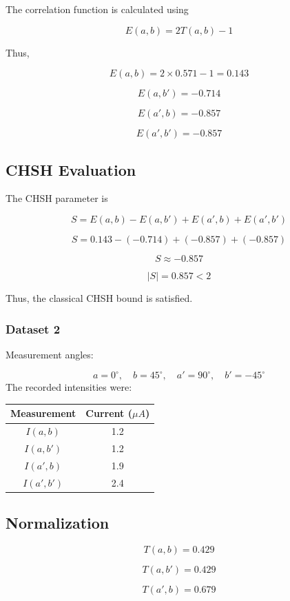 \documentclass[14pt,a4paper]{extarticle}
\begin{document}
The correlation function is calculated using

\[
E(a,b) = 2T(a,b) - 1
\]

Thus,

\[
E(a,b) = 2\times0.571 - 1 = 0.143
\]

\[
E(a,b') = -0.714
\]

\[
E(a',b) = -0.857
\]

\[
E(a',b') = -0.857
\]

\subsection {CHSH Evaluation}

The CHSH parameter is

\[
S = E(a,b) - E(a,b') + E(a',b) + E(a',b')
\]

\[
S = 0.143 - (-0.714) + (-0.857) + (-0.857)
\]

\[
S \approx -0.857
\]

\[
|S| = 0.857 < 2
\]

Thus, the classical CHSH bound is satisfied.

\subsubsection {Dataset 2}

Measurement angles:

\[
a = 0^\circ, \quad b = 45^\circ, \quad a' = 90^\circ, \quad b' = -45^\circ
\]
The recorded intensities were:

\begin{table}[h]
\centering
\begin{tabular}{c c}
Measurement & Current ($\mu A$) \\
\hline
$I(a,b)$ & 1.2 \\
$I(a,b')$ & 1.2 \\
$I(a',b)$ & 1.9 \\
$I(a',b')$ & 2.4 \\
\end{tabular}
\end{table}

\subsection {Normalization}

\[
T(a,b) = 0.429
\]

\[
T(a,b') = 0.429
\]

\[
T(a',b) = 0.679
\]
\end{document}
